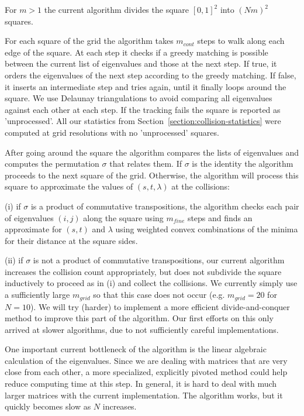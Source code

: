 \documentclass{article}
\begin{document}
	For $m > 1$ the current algorithm divides the square $[0,1]^2$
	into $(N m)^2$ squares. 
	
	For each square of the grid the algorithm 
	takes $m_{cont}$ steps to walk along each edge of the square.
	At each step it checks if a greedy matching is possible between the current list of
	eigenvalues and those at the next step. 
	If true, it orders the eigenvalues of the next step according to the greedy matching.
	If false, it inserts an intermediate step and tries again, until it finally loops around the square.
	We use Delaunay triangulations to avoid comparing all eigenvalues against each other 
	at each step. If the tracking fails the square is reported as 'unprocessed'.
	All our statistics from Section~\ref{section:collision-statistics} were computed
	at grid resolutions with no 'unprocessed' squares.

	After going around the square the algorithm compares the lists of eigenvalues
	and computes the permutation $\sigma$ that relates them.
	If $\sigma$ is the identity the algorithm proceeds to the next square of the grid.
	Otherwise, the algorithm will process this square to approximate the values 
	of $(s,t, \lambda)$ at the collisions:

	(i) if $\sigma$ is a product of commutative transpositions, 
	the algorithm checks each pair of eigenvalues $(i,j)$ along the square
	using $m_{fine}$ steps
	and finds an approximate for $(s,t)$ and $\lambda$  
	using weighted convex combinations of the minima for their distance 
	at the square sides.

	(ii) if $\sigma$ is not a product of commutative transpositions, 
	our current algorithm increases the collision count appropriately, 
	but does not subdivide the square inductively
	to proceed as in (i) and collect the collisions.  
	We currently simply use a sufficiently large $m_{grid}$ so that this case does not occur 
	(e.g. $m_{grid}= 20$ for $N=10$).
	We will try (harder) to implement a more efficient divide-and-conquer method to improve
	this part of the algorithm. 
	Our first efforts on this only arrived at slower algorithms, 
	due to not sufficiently careful implementations.
	
	One important current bottleneck of the algorithm 
	is the linear algebraic calculation of the eigenvalues.
	Since we are dealing with matrices that are very close from each other, 
	a more specialized, explicitly pivoted method could 
	help reduce computing time at this step.
	In general, it is hard to deal with much larger matrices with the current implementation.
	The algorithm works, but it quickly becomes slow as $N$ increases. 
	
\end{document}
